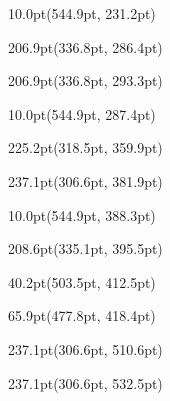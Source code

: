 \documentclass{article}
\begin{document}
\begin{textblock*}{10.0pt}(544.9pt, 231.2pt)%
\noindent%
%
\end{textblock*}
\begin{textblock*}{206.9pt}(336.8pt, 286.4pt)%
\noindent%
%
\end{textblock*}
\begin{textblock*}{206.9pt}(336.8pt, 293.3pt)%
\noindent%
%
\end{textblock*}
\begin{textblock*}{10.0pt}(544.9pt, 287.4pt)%
\noindent%
%
\end{textblock*}
\begin{textblock*}{225.2pt}(318.5pt, 359.9pt)%
\noindent%
%
\end{textblock*}
\begin{textblock*}{237.1pt}(306.6pt, 381.9pt)%
\noindent%
%
\end{textblock*}
\begin{textblock*}{10.0pt}(544.9pt, 388.3pt)%
\noindent%
%
\end{textblock*}
\begin{textblock*}{208.6pt}(335.1pt, 395.5pt)%
\noindent%
%
\end{textblock*}
\begin{textblock*}{40.2pt}(503.5pt, 412.5pt)%
\noindent%
%
\end{textblock*}
\begin{textblock*}{65.9pt}(477.8pt, 418.4pt)%
\noindent%
%
\end{textblock*}
\begin{textblock*}{237.1pt}(306.6pt, 510.6pt)%
\noindent%
%
\end{textblock*}
\begin{textblock*}{237.1pt}(306.6pt, 532.5pt)%
\noindent%
%
\end{textblock*}
\end{document}
